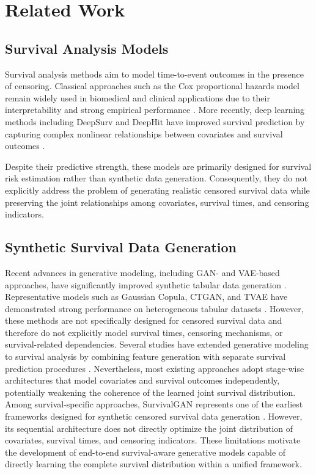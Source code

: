 \documentclass[twoside]{article}
\begin{document}
\section{Related Work}

\subsection{Survival Analysis Models}
Survival analysis methods aim to model time-to-event outcomes in the presence of censoring. Classical approaches such as the Cox proportional hazards model remain widely used in biomedical and clinical applications due to their interpretability and strong empirical performance \cite{Cox1972,Kleinbaum2012}. More recently, deep learning methods including DeepSurv and DeepHit have improved survival prediction by capturing complex nonlinear relationships between covariates and survival outcomes \cite{Katzman2018,Lee2018}.

Despite their predictive strength, these models are primarily designed for survival risk estimation rather than synthetic data generation. Consequently, they do not explicitly address the problem of generating realistic censored survival data while preserving the joint relationships among covariates, survival times, and censoring indicators.
\subsection{Synthetic Survival Data Generation}
Recent advances in generative modeling, including GAN- and VAE-based approaches, have significantly improved synthetic tabular data generation \cite{Goodfellow2014,Kingma2014,Xu2019}. Representative models such as Gaussian Copula, CTGAN, and TVAE have demonstrated strong performance on heterogeneous tabular datasets \cite{Xu2019}. However, these methods are not specifically designed for censored survival data and therefore do not explicitly model survival times, censoring mechanisms, or survival-related dependencies.
Several studies have extended generative modeling to survival analysis by combining feature generation with separate survival prediction procedures \cite{Gong2021,Lopez2023}. Nevertheless, most existing approaches adopt stage-wise architectures that model covariates and survival outcomes independently, potentially weakening the coherence of the learned joint survival distribution.
Among survival-specific approaches, SurvivalGAN represents one of the earliest frameworks designed for synthetic censored survival data generation \cite{Norcliffe2023}. However, its sequential architecture does not directly optimize the joint distribution of covariates, survival times, and censoring indicators. These limitations motivate the development of end-to-end survival-aware generative models capable of directly learning the complete survival distribution within a unified framework.
\end{document}
